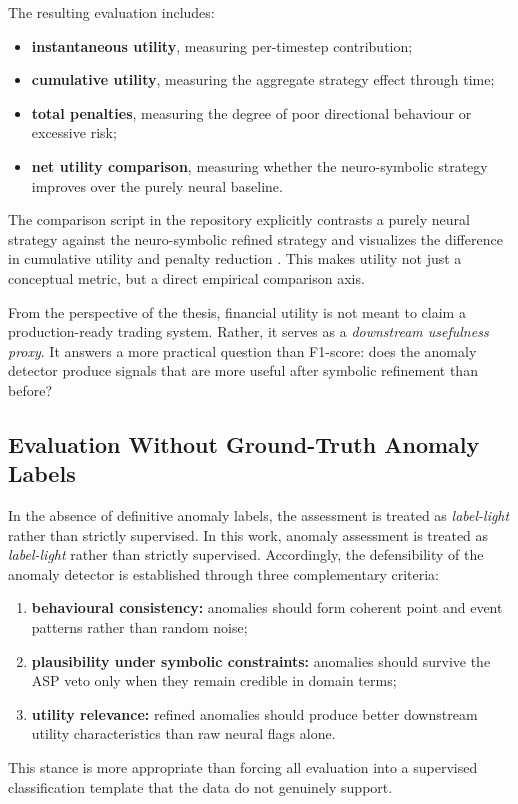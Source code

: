 The resulting evaluation includes:
\begin{itemize}
	\item \textbf{instantaneous utility}, measuring per-timestep contribution;
	\item \textbf{cumulative utility}, measuring the aggregate strategy effect through time;
	\item \textbf{total penalties}, measuring the degree of poor directional behaviour or excessive risk;
	\item \textbf{net utility comparison}, measuring whether the neuro-symbolic strategy improves over the purely neural baseline.
\end{itemize}

The comparison script in the repository explicitly contrasts a purely neural strategy against the neuro-symbolic refined strategy and visualizes the difference in cumulative utility and penalty reduction \cite{repo_thesis_grid_anomaly}. This makes utility not just a conceptual metric, but a direct empirical comparison axis.

From the perspective of the thesis, financial utility is not meant to claim a production-ready trading system. Rather, it serves as a \emph{downstream usefulness proxy}. It answers a more practical question than F1-score: does the anomaly detector produce signals that are more useful after symbolic refinement than before?

\subsection{Evaluation Without Ground-Truth Anomaly Labels}

In the absence of definitive anomaly labels, the assessment is treated as
\emph{label-light} rather than strictly supervised. In this work, anomaly assessment is treated as \emph{label-light} rather than strictly supervised. Accordingly, the defensibility of the anomaly detector is established through three complementary criteria:
\begin{enumerate}
	\item \textbf{behavioural consistency:} anomalies should form coherent point and event patterns rather than random noise;
	\item \textbf{plausibility under symbolic constraints:} anomalies should survive the ASP veto only when they remain credible in domain terms;
	\item \textbf{utility relevance:} refined anomalies should produce better downstream utility characteristics than raw neural flags alone.
\end{enumerate}
This stance is more appropriate than forcing all evaluation into a supervised classification template that the data do not genuinely support.


